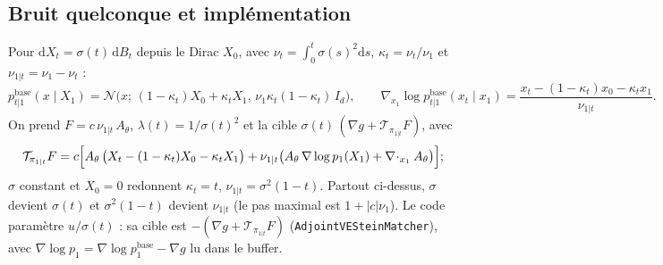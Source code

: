 \documentclass[11pt]{article}
\newcommand{\N}{\mathcal{N}}
\newcommand{\Id}{I_d}
\newcommand{\dd}{\mathrm{d}}
\newcommand{\pbase}{p^{\mathrm{base}}}
\newcommand{\divg}{\nabla\!\cdot}
\begin{document}
\subsection{Bruit quelconque et implémentation}

Pour $\dd X_t = \sigma(t)\, \dd B_t$ depuis le Dirac $X_0$, avec $\nu_t = \int_0^t \sigma(s)^2 \dd s$, $\kappa_t = \nu_t / \nu_1$ et $\nu_{1|t} = \nu_1 - \nu_t$ :
\begin{equation}
\pbase_{t|1}(x \mid X_1) = \N\bigl(x;\, (1-\kappa_t) X_0 + \kappa_t X_1,\, \nu_1 \kappa_t (1-\kappa_t)\, \Id\bigr),
\qquad
\nabla_{x_1} \log \pbase_{t|1}(x_t \mid x_1) = \frac{x_t - (1-\kappa_t) x_0 - \kappa_t x_1}{\nu_{1|t}} .
\end{equation}
On prend $F = c\, \nu_{1|t}\, A_\theta$, $\lambda(t) = 1/\sigma(t)^2$ et la cible $\sigma(t)\,(\nabla g + \mathcal{T}_{\pi_{1|t}} F)$, avec
\begin{equation}
\mathcal{T}_{\pi_{1|t}} F
= c\Bigl[ A_\theta\,\bigl(X_t - (1-\kappa_t) X_0 - \kappa_t X_1\bigr)
+ \nu_{1|t} \bigl( A_\theta\, \nabla \log p_1(X_1) + \divg_{x_1} A_\theta \bigr) \Bigr] ;
\end{equation}
$\sigma$ constant et $X_0 = 0$ redonnent $\kappa_t = t$, $\nu_{1|t} = \sigma^2(1-t)$. Partout ci-dessus, $\sigma$ devient $\sigma(t)$ et $\sigma^2(1-t)$ devient $\nu_{1|t}$ (le pas maximal est $1 + |c|\nu_1$). Le code paramètre $u/\sigma(t)$ : sa cible est $-(\nabla g + \mathcal{T}_{\pi_{1|t}} F)$ (\texttt{AdjointVESteinMatcher}), avec $\nabla \log p_1 = \nabla \log \pbase_1 - \nabla g$ lu dans le buffer.
\end{document}

